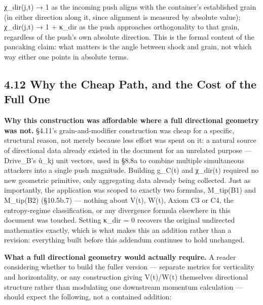 \documentclass[
]{article}
\begin{document}
χ\_dir(j,t) → 1 as the incoming push aligns with the container's
established grain (in either direction along it, since alignment is
measured by absolute value); χ\_dir(j,t) → 1 + κ\_dir as the push
approaches orthogonality to that grain, regardless of the push's own
absolute direction. This is the formal content of the pancaking claim:
what matters is the angle between shock and grain, not which way either
one points in absolute terms.

\hypertarget{why-the-cheap-path-and-the-cost-of-the-full-one}{%
\subsection{4.12 Why the Cheap Path, and the Cost of the Full
One}\label{why-the-cheap-path-and-the-cost-of-the-full-one}}

\textbf{Why this construction was affordable where a full directional
geometry was not.} §4.11's grain-and-modifier construction was cheap for
a specific, structural reason, not merely because less effort was spent
on it: a natural source of directional data already existed in the
document for an unrelated purpose --- Drive\_B's û\_kj unit vectors,
used in §8.8a to combine multiple simultaneous attackers into a single
push magnitude. Building g\_C(t) and χ\_dir(t) required no new geometric
primitive, only aggregating data already being collected. Just as
importantly, the application was scoped to exactly two formulas,
M\_tip(B1) and M\_tip(B2) (§10.5b.7) --- nothing about V(t), W(t), Axiom
C3 or C4, the entropy-regime classification, or any divergence formula
elsewhere in this document was touched. Setting κ\_dir = 0 recovers the
original undirected mathematics exactly, which is what makes this an
addition rather than a revision: everything built before this addendum
continues to hold unchanged.

\textbf{What a full directional geometry would actually require.} A
reader considering whether to build the fuller version --- separate
metrics for verticality and horizontality, or any construction giving
V(t)/W(t) themselves directional structure rather than modulating one
downstream momentum calculation --- should expect the following, not a
contained addition:
\end{document}

